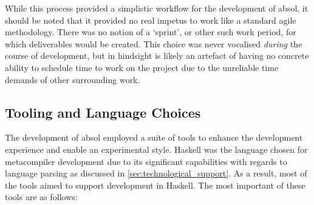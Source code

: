 While this process provided a simplistic workflow for the development of \gls{absol}, it should be noted that it provided no real impetus to work like a standard agile methodology.
There was no notion of a `sprint', or other such work period, for which deliverables would be created.
This choice was never vocalised \textit{during} the course of development, but in hindsight is likely an artefact of having no concrete ability to schedule time to work on the project due to the unreliable time demands of other surrounding work. 


\subsection{Tooling and Language Choices} %
\label{sub:tooling_and_language_choices}
The development of \gls{absol} employed a suite of tools to enhance the development experience and enable an experimental style.
Haskell was the language chosen for metacompiler development due to its significant capabilities with regards to language parsing as discussed in \autoref{sec:technological_support}.
As a result, most of the tools aimed to support development in Haskell.
The most important of these tools are as follows:
